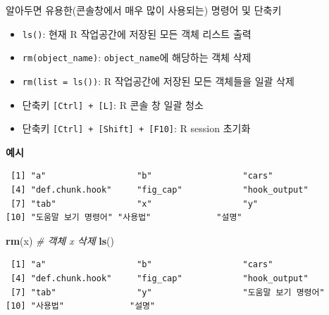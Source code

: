 \documentclass[
  11pt,
]{krantz}
\newenvironment{Shaded}{\begin{snugshade}}{\end{snugshade}}
\newcommand{\CommentTok}[1]{\textcolor[rgb]{0.37,0.37,0.37}{\textit{#1}}}
\newcommand{\DecValTok}[1]{\textcolor[rgb]{0.06,0.06,0.06}{#1}}
\newcommand{\KeywordTok}[1]{\textcolor[rgb]{0.27,0.27,0.27}{\textbf{#1}}}
\newcommand{\NormalTok}[1]{#1}
\newcommand{\OperatorTok}[1]{\textcolor[rgb]{0.43,0.43,0.43}{\textbf{#1}}}
\newcommand{\StringTok}[1]{\textcolor[rgb]{0.5,0.5,0.5}{#1}}
\providecommand{\tightlist}{%
  \setlength{\itemsep}{0pt}\setlength{\parskip}{0pt}}
\let\BeginKnitrBlock\begin \let\EndKnitrBlock\end
\begin{document}
\BeginKnitrBlock{rmdtip}
알아두면 유용한(콘솔창에서 매우 많이 사용되는) 명령어 및 단축키

\begin{itemize}
\tightlist
\item
  \texttt{ls()}: 현재 R 작업공간에 저장된 모든 객체 리스트 출력
\item
  \texttt{rm(object\_name)}: \texttt{object\_name}에 해당하는 객체 삭제
\item
  \texttt{rm(list\ =\ ls())}: R 작업공간에 저장된 모든 객체들을 일괄 삭제
\item
  단축키 \texttt{{[}Ctrl{]}\ +\ {[}L{]}}: R 콘솔 창 일괄 청소
\item
  단축키 \texttt{{[}Ctrl{]}\ +\ {[}Shift{]}\ +\ {[}F10{]}}: R session 초기화
\end{itemize}

\textbf{예시}
\EndKnitrBlock{rmdtip}

\normalsize

\footnotesize

\begin{Shaded}
\end{Shaded}

\begin{verbatim}
 [1] "a"                  "b"                  "cars"              
 [4] "def.chunk.hook"     "fig_cap"            "hook_output"       
 [7] "tab"                "x"                  "y"                 
[10] "도움말 보기 명령어" "사용법"             "설명"              
\end{verbatim}

\normalsize

\footnotesize

\begin{Shaded}
\begin{Highlighting}[]
\KeywordTok{rm}\NormalTok{(x) }\CommentTok{# 객체 x 삭제}
\KeywordTok{ls}\NormalTok{()}
\end{Highlighting}
\end{Shaded}

\begin{verbatim}
 [1] "a"                  "b"                  "cars"              
 [4] "def.chunk.hook"     "fig_cap"            "hook_output"       
 [7] "tab"                "y"                  "도움말 보기 명령어"
[10] "사용법"             "설명"              
\end{verbatim}
\end{document}
